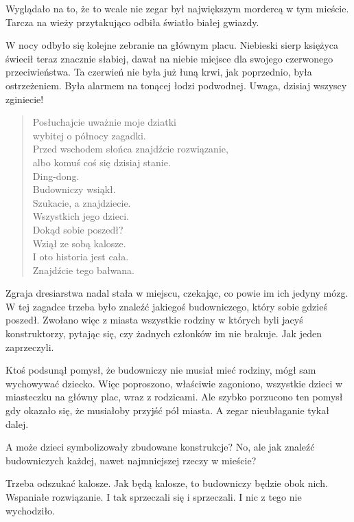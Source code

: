 Wyglądało na to, że to wcale nie zegar był największym mordercą w tym mieście.
Tarcza na wieży przytakująco odbiła światło białej gwiazdy.

W nocy odbyło się kolejne zebranie na głównym placu.
Niebieski sierp księżyca świecił teraz znacznie słabiej, dawał na niebie miejsce dla swojego czerwonego przeciwieństwa.
Ta czerwień nie była już łuną krwi, jak poprzednio, była ostrzeżeniem.
Była alarmem na tonącej łodzi podwodnej.
Uwaga, dzisiaj wszyscy zginiecie!

\begin{sl}
\begin{quote}
Posłuchajcie uważnie moje dziatki \\
wybitej o północy zagadki. \\
Przed wschodem słońca znajdźcie rozwiązanie, \\
albo komuś coś się dzisiaj stanie. \\
Ding-dong. \\
Budowniczy wsiąkł. \\
Szukacie, a znajdziecie. \\
Wszystkich jego dzieci. \\
Dokąd sobie poszedł? \\
Wziął ze sobą kalosze. \\
I oto historia jest cała. \\
Znajdźcie tego bałwana. \\
\end{quote}
\end{sl}

Zgraja dresiarstwa nadal stała w miejscu, czekając, co powie im ich jedyny mózg.
W tej zagadce trzeba było znaleźć jakiegoś budowniczego, który sobie gdzieś poszedł.
Zwołano więc z miasta wszystkie rodziny w których byli jacyś konstruktorzy, pytając się, czy żadnych członków im nie brakuje.
Jak jeden zaprzeczyli.

Ktoś podsunął pomysł, że budowniczy nie musiał mieć rodziny, mógł sam wychowywać dziecko.
Więc poproszono, właściwie zagoniono, wszystkie dzieci w miasteczku na główny plac, wraz z rodzicami.
Ale szybko porzucono ten pomysł gdy okazało się, że musiałoby przyjść pół miasta.
A zegar nieubłaganie tykał dalej.

A może dzieci symbolizowały zbudowane konstrukcje? 
No, ale jak znaleźć budowniczych każdej, nawet najmniejszej rzeczy w mieście?

Trzeba odszukać kalosze. Jak będą kalosze, to budowniczy będzie obok nich. Wspaniałe rozwiązanie.
I tak sprzeczali się i sprzeczali.
I nic z tego nie wychodziło.

